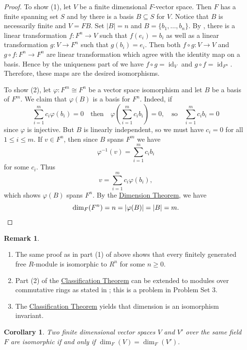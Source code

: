 \documentclass[12pt]{report}
\newtheorem{corollary}[theorem]{Corollary}
\numberwithin{equation}{section}
\numberwithin{theorem}{chapter}
\theoremstyle{definition}
\newtheorem*{basic properties}{Basic Properties}
\newtheorem*{Important Remark}{Important Remark}
\newtheorem{remark}[theorem]{Remark}
\DeclareMathOperator{\id}{id}
\begin{document}
\begin{proof}
To show (1), let $V$ be a finite dimensional $F$-vector space. Then $F$ has a finite spanning set $S$ and by  there is a basis $B\subseteq S$ for $V$. Notice that $B$ is necessarily finite and $V=FB$. Set $|B|=n$ and $B=\{b_1,\ldots,b_n\}$. By , there is a linear transformation $f\!:F^n\to V$ such that $f(e_i)=b_i$ as well as a linear transformation $g\!:V\to F^n$ such that $g(b_i)=e_i$. Then both $f\circ g:V\to V$ and $g\circ f:F^n\to F^n$ are linear transformation which agree with the identity map on a basis. Hence by the uniqueness part of  we have $f\circ g=\id_V$ and $g\circ f=\id_{F^n}$. 
Therefore, these maps are the desired isomorphisms.

To show (2), let $\varphi:F^m\cong F^n$ be a vector space isomorphism and let $B$ be a basis of $F^m$.  We claim that $\varphi(B)$ is a basis for $F^n$. Indeed, if 
$$\sum_{i=1}^mc_i\varphi(b_i)=0 \quad \textrm{then} \quad \varphi \left(\sum_{i=1}^mc_ib_i \right)=0,
\quad \textrm{so} \quad \sum_{i=1}^mc_ib_i=0$$ 
since $\varphi$ is injective. But $B$ is linearly independent, so we must have $c_i=0$ for all $1 \leqslant i \leqslant m$. If $v\in F^n$, then since $B$ spans $F^m$ we have
$$\varphi^{-1}(v)=\sum_{i=1}^mc_ib_i$$
for some $c_i$. Thus 
$$v=\sum_{i=1}^mc_i\varphi(b_i),$$
which shows $\varphi(B)$ spans $F^n$.
By the \hyperref[thm1116a]{Dimension Theorem}, we have 
$$\dim_F(F^n)=n=|\varphi(B)|=|B|=m.\qedhere$$
\end{proof}


\begin{remark} $\,$
\begin{enumerate}[label=(\arabic*),itemsep=0mm]
\item The same proof as in part (1) of  above shows that every finitely generated free $R$-module is isomorphic to $R^n$ for some $n \geqslant 0$.
\item Part (2) of the \hyperref[classification of fg vector spaces]{Classification Theorem} can be extended to modules over commutative rings as stated in ; this is a problem in Problem Set 3.
\item The \hyperref[classification of fg vector spaces]{Classification Theorem} yields that dimension is an isomorphism invariant.
\end{enumerate}
\end{remark}

\begin{corollary}
Two finite dimensional vector spaces $V$ and $V'$ over the same field $F$ are isomorphic if and only if $\dim_F(V) = \dim_F(V')$.
\end{corollary}
\end{document}
